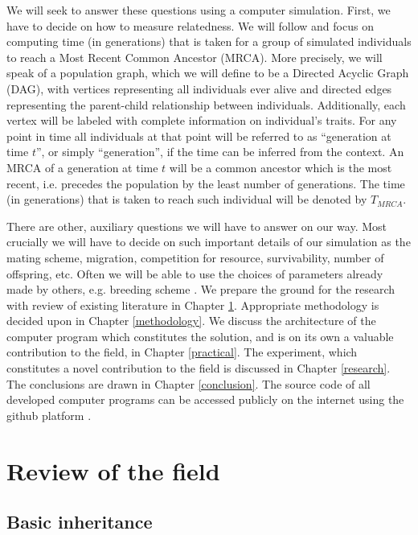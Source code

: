\documentclass{l4proj}
\begin{document}
We will seek to answer these questions using a computer simulation. First, we have to decide on how to measure relatedness. We will follow \textcite{rohde04} and focus on computing time (in generations) that is taken for a group of simulated individuals to reach a Most Recent Common Ancestor (MRCA). More precisely, we will speak of a \gls{population graph}, which we will define to be a Directed Acyclic Graph (DAG), with vertices representing all individuals ever alive and directed edges representing the parent-child relationship between individuals. Additionally, each vertex will be labeled with complete information on individual's traits. For any point in time all individuals at that point will be referred to as ``generation at time $t$'', or simply ``generation'', if the time can be inferred from the context. An MRCA of a generation at time $t$ will be a common ancestor which is the most recent, i.e. precedes the population by the least number of generations. The time (in generations) that is taken to reach such individual will be denoted by $T_{MRCA}$.

There are other, auxiliary questions we will have to answer on our way. Most crucially we will have to decide on such important details of our simulation as the mating scheme, migration, competition for resource, survivability, number of offspring, etc. Often we will be able to use the choices of parameters already made by others, e.g. breeding scheme \parencite{peng10}. We prepare the ground for the research with review of existing literature in Chapter \ref{review}. Appropriate methodology is decided upon in Chapter \ref{methodology}. We discuss the architecture of the computer program which constitutes the solution, and is on its own a valuable contribution to the field, in Chapter \ref{practical}. The experiment, which constitutes a novel contribution to the field is discussed in Chapter \ref{research}. The conclusions are drawn in Chapter \ref{conclusion}. The source code of all developed computer programs can be accessed publicly on the internet using the github platform \parencite{Kurkiewicz16}.


\chapter{Review of the field}\label{review}

\section{Basic inheritance}
\end{document}
